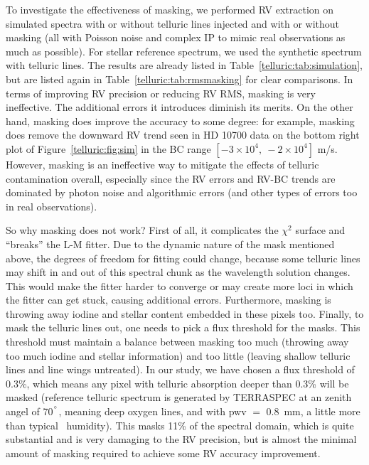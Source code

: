 To investigate the effectiveness of masking, we performed RV
extraction on simulated spectra with or without telluric lines
injected and with or without masking (all with Poisson noise and
complex IP to mimic real observations as much as possible). For
stellar reference spectrum, we used the synthetic spectrum with
telluric lines. The results are already listed in
Table~\ref{telluric:tab:simulation}, but are listed again in
Table~\ref{telluric:tab:rmsmasking} for clear comparisons. In terms of
improving RV precision or reducing RV RMS, masking is very
ineffective. The additional errors it introduces diminish its
merits. On the other hand, masking does improve the accuracy to some
degree: for example, masking does remove the downward RV trend seen in
HD 10700 data on the bottom right plot of
Figure~\ref{telluric:fig:sim} in the BC range $[-3\times10^4,\
-2\times10^4]$ m/s. However, masking is an ineffective way to mitigate
the effects of telluric contamination overall, especially since the RV
errors and RV-BC trends are dominated by photon noise and algorithmic
errors (and other types of errors too in real observations).

So why masking does not work? First of all, it complicates the
$\chi^2$ surface and ``breaks'' the L-M fitter. Due to the dynamic
nature of the mask mentioned above, the degrees of freedom for fitting
could change, because some telluric lines may shift in and out of this
spectral chunk as the wavelength solution changes. This would make the
fitter harder to converge or may create more loci in which the fitter
can get stuck, causing additional errors. Furthermore, masking is
throwing away iodine and stellar content embedded in these pixels
too. Finally, to mask the telluric lines out, one needs to pick a
flux threshold for the masks. This threshold must maintain a balance
between masking too much (throwing away too much iodine and stellar
information) and too little (leaving shallow telluric lines and line
wings untreated). In our study, we have chosen a flux threshold of
0.3\%, which means any pixel with telluric absorption deeper than
0.3\% will be masked (reference telluric spectrum is generated by
TERRASPEC at an zenith angel of 70$^{^{\circ}}$, meaning deep oxygen lines,
and with pwv $=$ 0.8~mm, a little more than
typical \keck\ humidity). This masks 11\% of the spectral domain,
which is quite substantial and is very damaging to the RV precision,
but is almost the minimal amount of masking required to achieve some
RV accuracy improvement.

